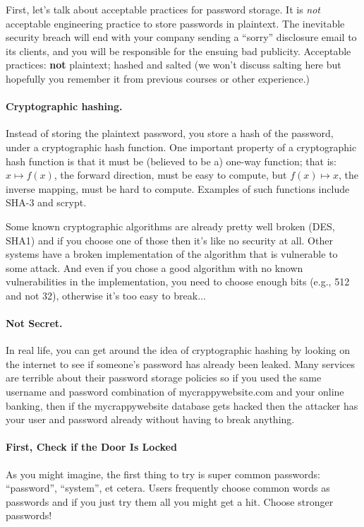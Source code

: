 \documentclass[a4paper]{report}
\begin{document}
First, let's talk about acceptable practices for password storage. It is \emph{not}
acceptable engineering practice to store passwords in plaintext. The inevitable security
breach will end with your company sending a ``sorry'' disclosure email to its clients,
and you will be responsible for the ensuing bad publicity. Acceptable practices: {\bf not} plaintext; hashed and salted (we won't discuss salting here but hopefully you remember it from previous courses or other experience.)

\paragraph{Cryptographic hashing.} Instead of storing the plaintext password, you
store a hash of the password, under a cryptographic hash function. One important
property of a cryptographic hash function is that it must be (believed to be a) one-way
function; that is: $x \mapsto f(x)$, the forward direction, must be easy to compute, but
$f(x) \mapsto x$, the inverse mapping, must be hard to compute. Examples of such functions
include SHA-3 and scrypt. 

Some known cryptographic algorithms are already pretty well broken (DES, SHA1) and if you choose one of those then it's like no security at all. Other systems have a broken implementation of the algorithm that is vulnerable to some attack. And even if you chose a good algorithm with no known vulnerabilities in the implementation, you need to choose enough bits (e.g., 512 and not 32), otherwise it's too easy to break...

\paragraph{Not Secret.}
In real life, you can get around the idea of cryptographic hashing by looking on the internet to see if someone's password has already been leaked. Many services are terrible about their password storage policies so if you used the same username and password combination of mycrappywebsite.com and your online banking, then if the mycrappywebsite database gets hacked then the attacker has your user and password already without having to break anything.

\paragraph{First, Check if the Door Is Locked}
As you might imagine, the first thing to try is super common passwords: ``password'', ``system'', et cetera. Users frequently choose common words as passwords and if you just try them all you might get a hit. Choose stronger passwords!
\end{document}
